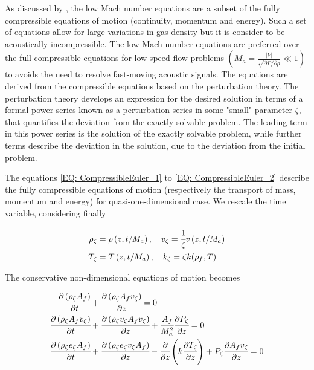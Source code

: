 \documentclass[../Article_Model_Parameters.tex]{subfiles}
\begin{document}
	
	As discussed by \citet{Lions2013}, the low Mach number equations are a subset of the fully compressible equations of motion (continuity, momentum and energy). Such a set of equations allow for large variations in gas density but it is consider to be acoustically incompressible. The low Mach number equations are preferred over the full compressible equations for low speed flow problems $\left( M_a = \frac{|V|}{\sqrt{ \partial P / \partial \rho }} \ll 1 \right)$ to avoids the need to resolve fast-moving acoustic signals. The equations are derived from the compressible equations based on the perturbation theory. The perturbation theory develops an expression for the desired solution in terms of a formal power series known as a perturbation series in some "small" parameter $\zeta$, that quantifies the deviation from the exactly solvable problem. The leading term in this power series is the solution of the exactly solvable problem, while further terms describe the deviation in the solution, due to the deviation from the initial problem. 
	
	The equations \ref{EQ: CompressibleEuler_1} to \ref{EQ: CompressibleEuler_2} describe the fully compressible equations of motion (respectively the transport of mass, momentum and energy) for quasi-one-dimensional case. We rescale the time variable, considering finally 
	
	{\footnotesize
		\begin{align*}
			\rho_\zeta 	&= \rho\left( z, t/M_a \right), \quad
			v_\zeta 	= \cfrac{1}{\zeta} v\left( z, t/M_a \right) \\ 
			T_\zeta 	&= T\left( z, t/M_a \right),  \quad 
			k_\zeta 	= \zeta k(\rho_f, T) 
		\end{align*} 
	}
	
	The conservative non-dimensional equations of motion becomes
	
	{\footnotesize
		\begin{align*}
			\cfrac{\partial \left( \rho_\zeta A_f \right)}{\partial t} &+ \cfrac{\partial \left( \rho_\zeta A_f v_\zeta \right)}{\partial z} = 0 \\
			\cfrac{\partial \left( \rho_\zeta A_f v_\zeta \right) }{\partial t}	&+ \cfrac{\partial \left( \rho_\zeta v_\zeta A_f v_\zeta \right)}{\partial z} + \cfrac{A_f}{M_a^2} \cfrac{\partial P_\zeta}{\partial z} = 0\\
			\cfrac{\partial \left( \rho_\zeta e_\zeta A_f \right) }{\partial t} &+ \cfrac{\partial \left( \rho_\zeta e_\zeta v_\zeta A_f \right)}{\partial z} - \cfrac{\partial}{\partial z} \left( k \cfrac{\partial T_\zeta}{\partial z} \right) + P_\zeta \cfrac{\partial A_f v_\zeta}{\partial z} = 0
		\end{align*}
	}
\end{document}
